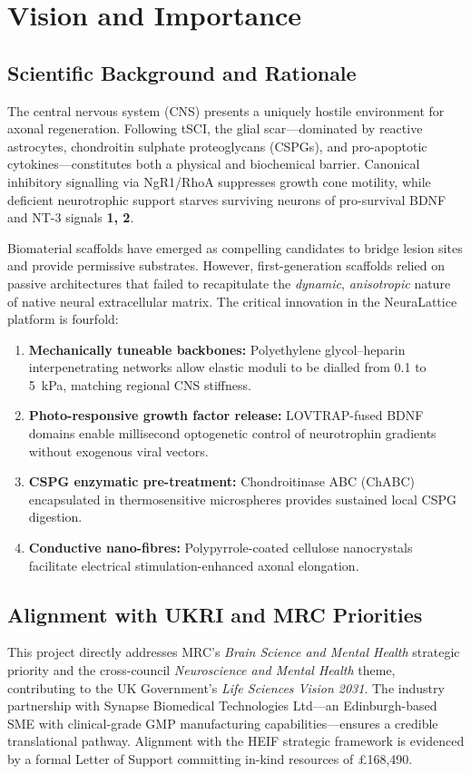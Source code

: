 \section{Vision and Importance}

\subsection{Scientific Background and Rationale}

The central nervous system (CNS) presents a uniquely hostile environment for axonal
regeneration. Following tSCI, the glial scar---dominated by reactive astrocytes,
chondroitin sulphate proteoglycans (CSPGs), and pro-apoptotic cytokines---constitutes
both a physical and biochemical barrier. Canonical inhibitory signalling via NgR1/RhoA
suppresses growth cone motility, while deficient neurotrophic support starves surviving
neurons of pro-survival BDNF and NT-3 signals \textbf{\lbrack{}1, 2\rbrack}.

Biomaterial scaffolds have emerged as compelling candidates to bridge lesion sites and
provide permissive substrates. However, first-generation scaffolds relied on passive
architectures that failed to recapitulate the \emph{dynamic}, \emph{anisotropic} nature
of native neural extracellular matrix. The critical innovation in the NeuraLattice platform
is fourfold:

\begin{enumerate}
  \item \textbf{Mechanically tuneable backbones:} Polyethylene glycol--heparin
    interpenetrating networks allow elastic moduli to be dialled from 0.1 to 5~kPa,
    matching regional CNS stiffness.
  \item \textbf{Photo-responsive growth factor release:} LOVTRAP-fused BDNF domains
    enable millisecond optogenetic control of neurotrophin gradients without exogenous
    viral vectors.
  \item \textbf{CSPG enzymatic pre-treatment:} Chondroitinase ABC (ChABC) encapsulated
    in thermosensitive microspheres provides sustained local CSPG digestion.
  \item \textbf{Conductive nano-fibres:} Polypyrrole-coated cellulose nanocrystals
    facilitate electrical stimulation-enhanced axonal elongation.
\end{enumerate}

\subsection{Alignment with UKRI and MRC Priorities}

This project directly addresses MRC's \emph{Brain Science and Mental Health} strategic
priority and the cross-council \emph{Neuroscience and Mental Health} theme, contributing
to the UK Government's \emph{Life Sciences Vision 2031}. The industry partnership with
Synapse Biomedical Technologies Ltd---an Edinburgh-based SME with clinical-grade GMP
manufacturing capabilities---ensures a credible translational pathway. Alignment with
the HEIF strategic framework is evidenced by a formal Letter of Support committing
in-kind resources of \pounds 168,490.

